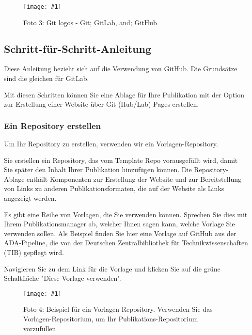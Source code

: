 \documentclass{article}
\newlength{\imgwidth}
\newcommand\scaledgraphics[2]{%
                
\settowidth{\imgwidth}{\texttt{[image: \#1]}}%
                
\setlength{\imgwidth}{\minof{\imgwidth}{#2\textwidth}}%
                
\texttt{[image: \#1]}%
                
}
\begin{document}
\begin{figure}
\scaledgraphics{7de3d3b1-1706-4dde-a73d-2bd35c02487f.png}{1}
\caption*{Foto 3: Git logos - Git; GitLab, and; GitHub}\label{F72941601}
\end{figure}


\subsection{Schritt-für-Schritt-Anleitung}\label{H7833693}



Diese Anleitung bezieht sich auf die Verwendung von GitHub. Die Grundsätze sind die gleichen für GitLab.


Mit diesen Schritten können Sie eine Ablage für Ihre Publikation mit der Option zur Erstellung einer Website über Git (Hub/Lab) Pages erstellen.


\subsubsection{Ein Repository erstellen}\label{H7778151}



Um Ihr Repository zu erstellen, verwenden wir ein Vorlagen-Repository.


Sie erstellen ein Repository, das vom Template Repo vorausgefüllt wird, damit Sie später den Inhalt Ihrer Publikation hinzufügen können. Die Repository-Ablage enthält Komponenten zur Erstellung der Website und zur Bereitstellung von Links zu anderen Publikationsformaten, die auf der Website als Links angezeigt werden.


Es gibt eine Reihe von Vorlagen, die Sie verwenden können. Sprechen Sie dies mit Ihrem Publikationsmanager ab, welcher Ihnen sagen kann, welche Vorlage Sie verwenden sollen. Als Beispiel finden Sie hier eine Vorlage auf GitHub aus der \href{https://github.com/TIBHannover/ADA-Book-Template}{ADA-Pipeline}, die von der Deutschen Zentralbibliothek für Technikwissenschaften (TIB) gepflegt wird.


Navigieren Sie zu dem Link für die Vorlage und klicken Sie auf die grüne Schaltfläche "Diese Vorlage verwenden".

\begin{figure}
\scaledgraphics{0ce6c9ea-6817-4c0d-b56b-93b0dcd88ac8.png}{1}
\caption*{Foto 4: Beispiel für ein Vorlagen-Repository. Verwenden Sie das Vorlagen-Repositorium, um Ihr Publikations-Repositorium vorzufüllen}\label{F95809581}
\end{figure}
\end{document}
